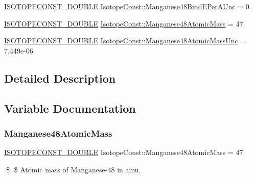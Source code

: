 \begin{DoxyCompactItemize}
\mbox{\hyperlink{group___isotope_const-_macros_ga8f45a7272ce02c0b4c65c44636ed719a}{I\+S\+O\+T\+O\+P\+E\+C\+O\+N\+S\+T\+\_\+\+D\+O\+U\+B\+LE}} \mbox{\hyperlink{group___isotope_const-_manganese-_mn48_ga612d9cc4bd0208bfd4e7e93de3ebfc80}{Isotope\+Const\+::\+Manganese48\+Bind\+E\+Per\+A\+Unc}} = 0.
\item 
\mbox{\hyperlink{group___isotope_const-_macros_ga8f45a7272ce02c0b4c65c44636ed719a}{I\+S\+O\+T\+O\+P\+E\+C\+O\+N\+S\+T\+\_\+\+D\+O\+U\+B\+LE}} \mbox{\hyperlink{group___isotope_const-_manganese-_mn48_ga77eba0aad864bb606485f66d3b8178a2}{Isotope\+Const\+::\+Manganese48\+Atomic\+Mass}} = 47.
\item 
\mbox{\hyperlink{group___isotope_const-_macros_ga8f45a7272ce02c0b4c65c44636ed719a}{I\+S\+O\+T\+O\+P\+E\+C\+O\+N\+S\+T\+\_\+\+D\+O\+U\+B\+LE}} \mbox{\hyperlink{group___isotope_const-_manganese-_mn48_ga95f7d1b0b228819136c7bf81297eda07}{Isotope\+Const\+::\+Manganese48\+Atomic\+Mass\+Unc}} = 7.\+449e-\/06
\end{DoxyCompactItemize}


\subsection{Detailed Description}


\subsection{Variable Documentation}
\mbox{\label{group___isotope_const-_manganese-_mn48_ga77eba0aad864bb606485f66d3b8178a2}} 
\subsubsection{\texorpdfstring{Manganese48\+Atomic\+Mass}{Manganese48AtomicMass}}
{\footnotesize\ttfamily \mbox{\hyperlink{group___isotope_const-_macros_ga8f45a7272ce02c0b4c65c44636ed719a}{I\+S\+O\+T\+O\+P\+E\+C\+O\+N\+S\+T\+\_\+\+D\+O\+U\+B\+LE}} Isotope\+Const\+::\+Manganese48\+Atomic\+Mass = 47.}

\$ \$ Atomic mass of Manganese-\/48 in amu. \mbox{\label{group___isotope_const-_manganese-_mn48_ga95f7d1b0b228819136c7bf81297eda07}} 
